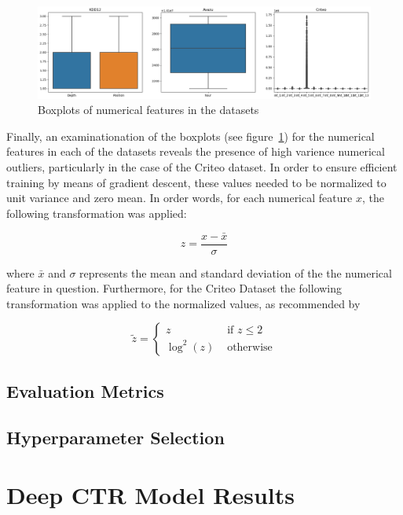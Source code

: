 \documentclass{mldsmsc}
\begin{document}
\begin{figure}[h]
    \centering
    \includegraphics[width=\textwidth]{../figures/numerical_boxplots.png}
    \caption{Boxplots of numerical features in the datasets}
    \label{fig:boxplots}
\end{figure}

Finally, an examinationation of the boxplots (see figure~\ref{fig:boxplots}) for the numerical features in
each of the datasets reveals the presence of high varience numerical outliers,
particularly in the case of the Criteo dataset. In order to ensure efficient
training by means of gradient descent, these values needed to be normalized to unit
variance and zero mean. In order words, for each numerical feature $x$,
the following transformation was applied:

$$
z = \frac{x - \bar{x}}{\sigma}
$$

where $\bar{x}$ and $\sigma$ represents the mean and standard deviation of the
the numerical feature in question. Furthermore, for the Criteo Dataset the following
transformation was applied to the normalized values, as recommended by \cite{RefWorks:song2019autoint}

\begin{equation*}
\tilde{z} = \begin{cases} z & \text{ if } z \leq 2 \\
    \log^{2}(z) & \text{ otherwise}
\end{cases}
\end{equation*}

\subsection{Evaluation Metrics}

\subsection{Hyperparameter Selection}

\section{Deep CTR Model Results}
\label{sec:model-results}
\end{document}
